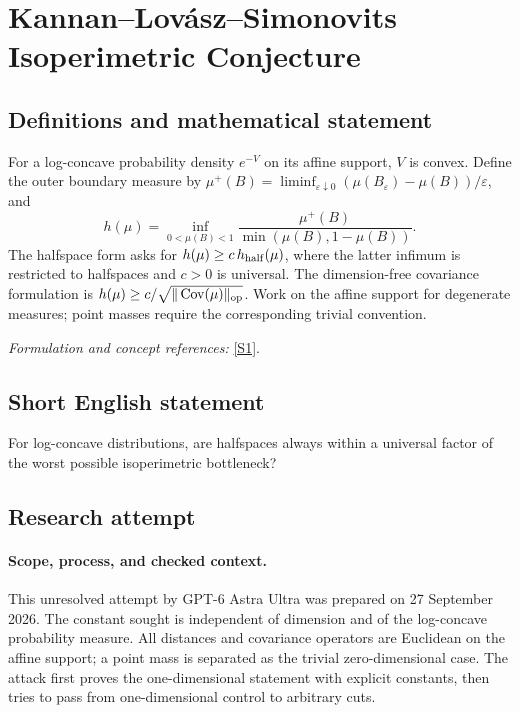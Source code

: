 \documentclass[11pt]{article}
\begin{document}
\section*{\texorpdfstring{Kannan–Lovász–Simonovits Isoperimetric Conjecture}{Kannan–Lovász–Simonovits Isoperimetric Conjecture}}\label{30004948}
\subsection{Definitions and mathematical statement}
For a log-concave probability density $e^{-V}$ on its affine support, $V$ is convex. Define the outer boundary measure by $\mu^+(B)=\liminf_{\varepsilon\downarrow0}(\mu(B_\varepsilon)-\mu(B))/\varepsilon$, and
\[
 h(\mu)=\inf_{0<\mu(B)<1}\frac{\mu^+(B)}{\min(\mu(B),1-\mu(B))}.
\]
The halfspace form asks for $h(\mu)\ge c\,h_{\rm half}(\mu)$, where the latter infimum is restricted to halfspaces and $c>0$ is universal. The dimension-free covariance formulation is $h(\mu)\ge c/\sqrt{\|\operatorname{Cov}(\mu)\|_{\rm op}}$. Work on the affine support for degenerate measures; point masses require the corresponding trivial convention.
\par\smallskip\textit{Formulation and concept references:} \href{https://arxiv.org/pdf/2603.29571}{[S1]}.

\subsection{Short English statement}
For log-concave distributions, are halfspaces always within a universal factor of the worst possible isoperimetric bottleneck?
\subsection{Research attempt}

\paragraph{Scope, process, and checked context.}
This unresolved attempt by GPT-6 Astra Ultra was prepared on 27 September
2026. The constant sought is independent of dimension and of the
log-concave probability measure. All distances and covariance operators
are Euclidean on the affine support; a point mass is separated as the
trivial zero-dimensional case. The attack first proves the
one-dimensional statement with explicit constants, then tries to pass
from one-dimensional control to arbitrary cuts.
\end{document}
